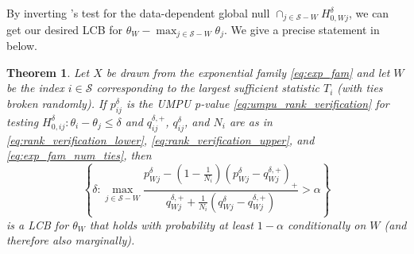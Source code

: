 \documentclass{article}
\newtheorem{theorem}{Theorem}
\begin{document}
By inverting 's test for the data-dependent global null $\cap_{j \in \mathcal{S} - W} H^{\delta}_{0, Wj}$, we can get our desired LCB for $\theta_W - \max_{j \in \mathcal{S} - W } \theta_j$. We give a precise statement in  below. 

\begin{theorem}
    \label{thm:rank_verification}
    Let $X$ be drawn from the exponential family \eqref{eq:exp_fam} and let $W$ be the index $i \in \mathcal{S}$ corresponding to the largest sufficient statistic $T_i$ (with ties broken randomly). If $p^{\delta}_{ij}$ is the UMPU p-value \eqref{eq:umpu_rank_verification} for testing $H^{\delta}_{0, ij} : \theta_i - \theta_j \leq \delta$ and $q^{\delta, +}_{ij}$, $q^{\delta}_{ij}$, and $N_{i}$ are as in \eqref{eq:rank_verification_lower},  \eqref{eq:rank_verification_upper}, and \eqref{eq:exp_fam_num_ties}, then 
    \begin{equation}
    \label{eq:rank_verification_lcb}
    \left\{\delta : \max_{j \in \mathcal{S} - W} \frac{p^{\delta}_{Wj} - \left(1 - \frac{1}{N_{i}} \right)(p^{\delta}_{Wj} - q^{\delta, +}_{Wj})_+ }{q^{\delta, +}_{Wj} + \frac{1}{N_{i}}(q^{\delta}_{Wj} - q^{\delta, +}_{Wj}) } > \alpha \right\} 
    \end{equation}
    is a LCB for $\theta_W$ that holds with probability at least $1 - \alpha$
    conditionally on $W$ (and therefore also marginally). 
\end{theorem}
\end{document}
